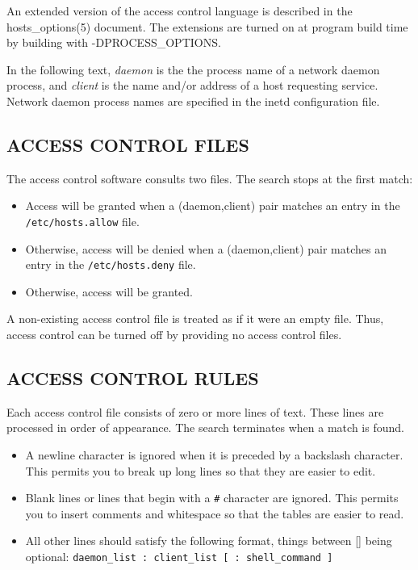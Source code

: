 \documentclass[11pt,twoside,onecolumn]{book}
\begin{document}
An extended version of the access control language is described in the
hosts\_options(5) document. The extensions are turned on at
program build time by building with -DPROCESS\_OPTIONS.

In the following text, {\em daemon} is the the process name of a
network daemon process, and {\em client} is the name and/or address of
a host requesting service. Network daemon process names are specified
in the inetd configuration file.

\subsection*{ACCESS CONTROL FILES}

The access control software consults two files. The search stops
at the first match:

\begin{itemize}
\item Access will be granted when a (daemon,client) pair matches an entry in
the {\tt /etc/hosts.allow} file.

\item Otherwise, access will be denied when a (daemon,client) pair matches an
entry in the {\tt /etc/hosts.deny} file.

\item Otherwise, access will be granted.

\end{itemize}

A non-existing access control file is treated as if it were an empty
file. Thus, access control can be turned off by providing no access
control files.

\subsection*{ACCESS CONTROL RULES}

Each access control file consists of zero or more lines of text.  These
lines are processed in order of appearance. The search terminates when a
match is found.

\begin{itemize}

\item A newline character is ignored when it is preceded by a backslash
character. This permits you to break up long lines so that they are
easier to edit.

\item Blank lines or lines that begin with a {\tt \#} character are ignored.
This permits you to insert comments and whitespace so that the tables
are easier to read.

\item All other lines should satisfy the following format, things between []
being optional: {\tt daemon\_list : client\_list [ : shell\_command ] }

\end{itemize}
\end{document}
